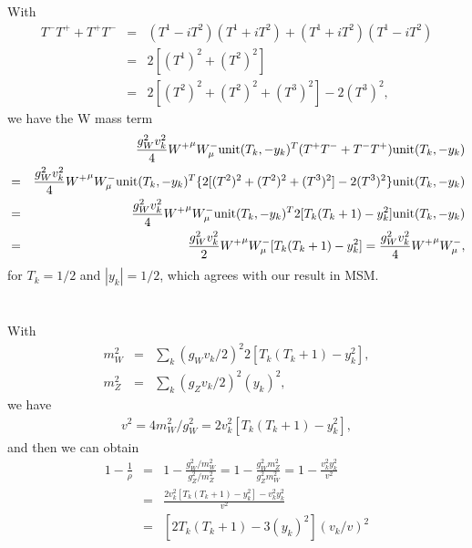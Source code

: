 \documentclass[11pt]{article}
\begin{document}
\section{ }
With
\begin{eqnarray}
    T^- T^+ + T^+ T^- &=& (T^1-iT^2)(T^1+iT^2)+(T^1+iT^2)(T^1-iT^2) \\ 
    &=& 2 [(T^1)^2 + (T^2)^2 ] \\
    &=& 2 [(T^2)^2 + (T^2)^2 + (T^3)^2] - 2(T^3)^2,
\end{eqnarray}
we have the W mass term
\begin{eqnarray}
    &&\frac{g_W^2 v_k^2}{4}{W^+}^\mu W^-_\mu {\rm unit}(T_k,-y_k)^T (T^+T^-+T^-T^+) {\rm unit}(T_k,-y_k) \\
    &=&\frac{g_W^2 v_k^2}{4}{W^+}^\mu W^-_\mu {\rm unit}(T_k,-y_k)^T \{ 2 [(T^2)^2 + (T^2)^2 + (T^3)^2] - 2(T^3)^2 \} {\rm unit}(T_k,-y_k) \nonumber \\
    &=& \frac{g_W^2 v_k^2}{4}{W^+}^\mu W^-_\mu {\rm unit}(T_k,-y_k)^T 2 [T_k(T_k+1) -y_k^2] {\rm unit}(T_k,-y_k) \nonumber \\
    &=&  \frac{g_W^2 v_k^2}{2}{W^+}^\mu W^-_\mu [T_k(T_k+1) -y_k^2] = \frac{g_W^2 v_k^2}{4}{W^+}^\mu W^-_\mu,
\end{eqnarray}
for $T_k=1/2$ and $|y_k|=1/2$, which agrees with our result in MSM.


\section{ }
With
\begin{eqnarray}
    m_W^2 &=& \sum_k (g_W v_k/2)^2 2 [ T_k(T_k+1) - y_k^2 ] ,\\
    m_Z^2 &=& \sum_k (g_Z v_k/2)^2 (y_k)^2,
\end{eqnarray}
we have
\begin{eqnarray}
v^2 = 4 m_W^2/g_W^2 = 2 v_k^2 [ T_k(T_k+1) - y_k^2 ],
\end{eqnarray}
and then we can obtain
\begin{eqnarray}
    1-\frac{1}{\rho}&=& 1- \frac{g_W^2/m_W^2}{g_Z^2/m_Z^2} =1-\frac{g_W^2 m_Z^2}{g_Z^2 m_W^2}=1- \frac{v_k^2y_k^2}{v^2} \\
    &=& \frac{2 v_k^2 [ T_k(T_k+1) - y_k^2 ] -v_k^2y_k^2 }{v^2}\\ 
    &=& [2T_k(T_k+1)-3(y_k)^2](v_k/v)^2
\end{eqnarray}
\end{document}
